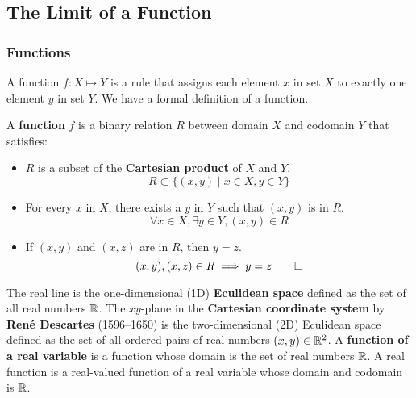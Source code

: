 \subsection{The Limit of a Function}

\subsubsection{Functions}
A function \(f:X\mapsto Y\) is a rule that assigns each element \(x\) in set
\(X\) to exactly one element \(y\) in set \(Y\).
We have a formal definition of a function.
\begin{definition}
    A \textbf{function} \(f\) is a binary relation \(R\) between domain \(X\)
    and codomain \(Y\) that satisfies:
    \begin{itemize}
        \item \(R\) is a subset of the \textbf{Cartesian product} of \(X\) and
        \(Y\).
        \[R\subset\{(x,y)\mid x\in X,y\in Y\}\]
        \item For every \(x\) in \(X\), there exists a \(y\) in \(Y\) such
        that \((x,y)\) is in \(R\).
        \[\forall x\in X,\exists y\in Y,(x,y)\in R\]
        \item If \((x,y)\) and \((x,z)\) are in \(R\), then \(y=z\).
        \[(x,y),(x,z)\in R\implies y=z \qedhere\]
    \end{itemize}
\end{definition}
The real line is the one-dimensional (1D) \textbf{Eculidean space} defined as
the set of all real numbers \(\mathbb{R}\).
The \(xy\)-plane in the \textbf{Cartesian coordinate system} by
\textbf{René Descartes} (1596--1650) is the two-dimensional (2D) Eculidean
space defined as the set of all ordered pairs of real numbers
\((x,y)\in\mathbb{R}^2\).
A \textbf{function of a real variable} is a function whose domain is the set
of real numbers \(\mathbb{R}\). A real function is a real-valued function of a real
variable whose domain and codomain is \(\mathbb{R}\).

